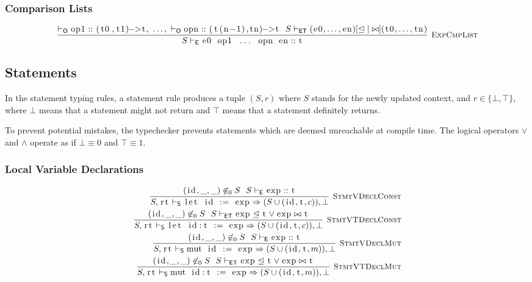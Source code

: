 \documentclass{article}
\newcommand{\code}[1]{\lstinline[columns=fixed]{#1}}
\newcommand{\drmrule}[5]{\frac{#1}{#2\vdash_{\mathsf{#3}}#4}\textsc{\ \small{#5}}}
\newcommand{\ruleapp}[1]{\vdash_{\mathsf{#1}}}
\newcommand{\mc}[1]{\textnormal{\code{#1}}}
\begin{document}
			\subsubsection{Comparison Lists}
			
				\begin{align*}
					\drmrule{\ruleapp{O}\mc{op1}::\mc{(t0,t1)->t},\ \dots,\ \ruleapp{O}\mc{opn}::\mc{(t(n-1),tn)->t}\ \ S\ruleapp{ET} (\mc{e0},\dots,\mc{en}) [\trianglelefteq|\bowtie] (\mc{t0},\dots,\mc{tn})}{S}{E}{\mc{e0 op1 ... opn en} :: \mc{t}}{ExpCmpList}
				\end{align*}
				
		\subsection{Statements}
		
			In the statement typing rules, a statement rule produces a tuple $(S,r)$ where $S$ stands for the newly updated context, and $r\in\{\bot,\top\}$, where $\bot$ means that a statement might not return and $\top$ means that a statement definitely returns.
			
			To prevent potential mistakes, the typechecker prevents statements which are deemed unreachable at compile time. The logical operators $\vee$ and $\wedge$ operate as if $\bot\equiv0$ and $\top\equiv1$.
		
			\subsubsection{Local Variable Declarations}
			
				\begin{align*}
					\drmrule{(\mc{id},\_,\_)\not\in_0 S\ \ S\ruleapp{E}\mc{exp} :: \mc{t}}{S,\mc{rt}}{S}{\mc{let id := exp} \Rightarrow (S \cup (\mc{id},\mc{t},c)),\bot}{StmtVDeclConst}\\
					\drmrule{(\mc{id},\_,\_)\not\in_0 S\ \ S\ruleapp{ET}\mc{exp}\trianglelefteq\mc{t}\vee\mc{exp}\bowtie\mc{t}}{S,\mc{rt}}{S}{\mc{let id:t := exp} \Rightarrow (S \cup (\mc{id},\mc{t},c)),\bot}{StmtVTDeclConst}\\
					\drmrule{(\mc{id},\_,\_)\not\in_0 S\ \ S\ruleapp{E}\mc{exp} :: \mc{t}}{S,\mc{rt}}{S}{\mc{mut id := exp} \Rightarrow (S \cup (\mc{id},\mc{t},m)),\bot}{StmtVDeclMut}\\
					\drmrule{(\mc{id},\_,\_)\not\in_0 S\ \ S\ruleapp{ET}\mc{exp}\trianglelefteq\mc{t}\vee\mc{exp}\bowtie\mc{t}}{S,\mc{rt}}{S}{\mc{mut id:t := exp} \Rightarrow (S \cup (\mc{id},\mc{t},m)),\bot}{StmtVTDeclMut}
				\end{align*}
			
\end{document}
